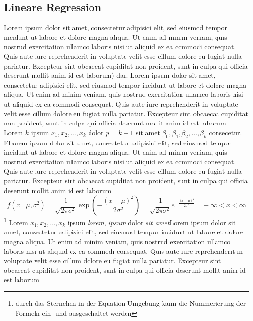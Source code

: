 \subsection{Lineare Regression}
Lorem ipsum dolor sit amet, consectetur adipisici elit, sed eiusmod tempor incidunt ut labore et dolore magna aliqua. Ut enim ad minim veniam, quis nostrud exercitation ullamco laboris nisi ut aliquid ex ea commodi consequat. Quis aute iure reprehenderit in voluptate velit esse cillum dolore eu fugiat nulla pariatur. Excepteur sint obcaecat cupiditat non proident, sunt in culpa qui officia deserunt mollit anim id est laborum\cite[S. 87]{woolridge2003introductory}) dar. Lorem ipsum dolor sit amet, consectetur adipisici elit, sed eiusmod tempor incidunt ut labore et dolore magna aliqua. Ut enim ad minim veniam, quis nostrud exercitation ullamco laboris nisi ut aliquid ex ea commodi consequat. Quis aute iure reprehenderit in voluptate velit esse cillum dolore eu fugiat nulla pariatur. Excepteur sint obcaecat cupiditat non proident, sunt in culpa qui officia deserunt mollit anim id est laborum.\cite[S. 103 ff.]{woolridge2003introductory} Lorem $k$ ipsum $x_1, x_2, \ldots, x_k$ dolor $p=k+1$ sit amet $\beta_0,\beta_1,\beta_2,\ldots, \beta_k$ consecetur.\cite[S. 71]{woolridge2003introductory} FLorem ipsum dolor sit amet, consectetur adipisici elit, sed eiusmod tempor incidunt ut labore et dolore magna aliqua. Ut enim ad minim veniam, quis nostrud exercitation ullamco laboris nisi ut aliquid ex ea commodi consequat. Quis aute iure reprehenderit in voluptate velit esse cillum dolore eu fugiat nulla pariatur. Excepteur sint obcaecat cupiditat non proident, sunt in culpa qui officia deserunt mollit anim id est laborum
%
\begin{equation*}
f(x \mid\mu,\sigma^2)=\frac{1}{\sqrt{2\pi\sigma^2}}\operatorname{exp}\left(-\frac{(x-\mu)^2}{2\sigma^2}\right)=\frac{1}{\sqrt{2\pi\sigma^2}} e^{-\frac{(x-\mu)^2}{2\sigma^2}}\quad -\infty<x<\infty
 \end{equation*}\footnote{durch das Sternchen in der Equation-Umgebung kann die Nummerierung der Formeln ein- und ausgeschaltet werden}
%
Lorem $x_1, x_2, \ldots, x_k$ ipsum \emph{lorem}, \emph{ipsum} dolor \emph{sit amet}Lorem ipsum dolor sit amet, consectetur adipisici elit, sed eiusmod tempor incidunt ut labore et dolore magna aliqua. Ut enim ad minim veniam, quis nostrud exercitation ullamco laboris nisi ut aliquid ex ea commodi consequat. Quis aute iure reprehenderit in voluptate velit esse cillum dolore eu fugiat nulla pariatur. Excepteur sint obcaecat cupiditat non proident, sunt in culpa qui officia deserunt mollit anim id est laborum\cite[S. 453]{fahrmeir2016statistik}
